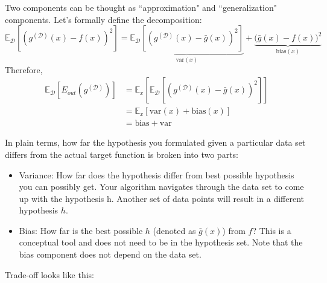 \documentclass[10pt]{article}
\numberwithin{equation}{section}  %
\begin{document}
Two components can be thought as ``approximation" and ``generalization" components. Let's formally define the decomposition:
\begin{equation}
    \mathbb{E}_\mathcal{D}\left[(g^{(\mathcal{D})}(x)-f(x))^2\right] = \underbrace{\mathbb{E}_\mathcal{D}\left[(g^{(\mathcal{D})}(x)-\bar{g}(x))^2\right]}_{\mathrm{var}(x)} + \underbrace{\Big(\bar{g}(x)-f(x)\Big)^2}_{\mathrm{bias}(x)}
\end{equation}
Therefore,
\begin{equation}
\begin{aligned}
    \mathbb{E}_\mathcal{D}\left[E_{out}(g^{(\mathcal{D})})\right] & = \mathbb{E}_x\left[\mathbb{E}_\mathcal{D}\left[(g^{(\mathcal{D})}(x)-\bar{g}(x))^2\right]\right] \\
    & = \mathbb{E}_x[\mathrm{var}(x)+\mathrm{bias}(x)] \\
    & = \mathrm{bias} + \mathrm{var}
\end{aligned}
\end{equation}

In plain terms, how far the hypothesis you formulated given a particular data set differs from the actual target function is broken into two parts:
\begin{itemize}
    \item Variance: How far does the hypothesis differ from best possible hypothesis you can possibly get. Your algorithm navigates through the data set to come up with the hypothesis h. Another set of data points will result in a different hypothesis $h$.
    \item Bias: How far is the best possible $h$ (denoted as $\bar{g}(x)$) from $f$? This is a conceptual tool and does not need to be in the hypothesis set. Note that the bias component does not depend on the data set.
\end{itemize}

Trade-off looks like this:
\end{document}

